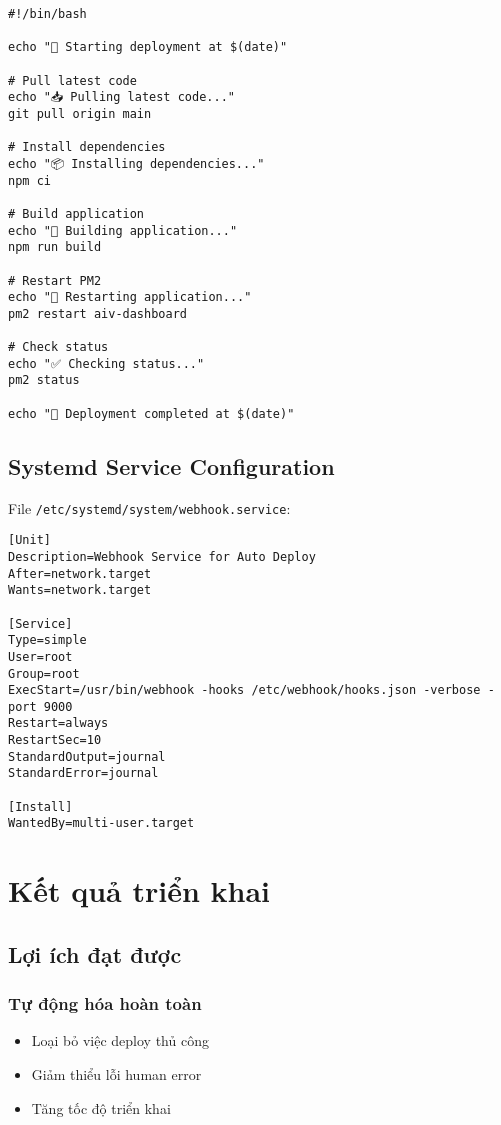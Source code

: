 \documentclass[12pt,a4paper]{article}
\begin{document}
\begin{lstlisting}[caption=Script deployment tự động]
#!/bin/bash

echo "🚀 Starting deployment at $(date)"

# Pull latest code
echo "📥 Pulling latest code..."
git pull origin main

# Install dependencies
echo "📦 Installing dependencies..."
npm ci

# Build application
echo "🔨 Building application..."
npm run build

# Restart PM2
echo "🔄 Restarting application..."
pm2 restart aiv-dashboard

# Check status
echo "✅ Checking status..."
pm2 status

echo "🎉 Deployment completed at $(date)"
\end{lstlisting}

\subsection{Systemd Service Configuration}

File \texttt{/etc/systemd/system/webhook.service}:

\begin{lstlisting}[caption=Cấu hình systemd service]
[Unit]
Description=Webhook Service for Auto Deploy
After=network.target
Wants=network.target

[Service]
Type=simple
User=root
Group=root
ExecStart=/usr/bin/webhook -hooks /etc/webhook/hooks.json -verbose -port 9000
Restart=always
RestartSec=10
StandardOutput=journal
StandardError=journal

[Install]
WantedBy=multi-user.target
\end{lstlisting}

\section{Kết quả triển khai}

\subsection{Lợi ích đạt được}

\subsubsection{Tự động hóa hoàn toàn}
\begin{itemize}
    \item Loại bỏ việc deploy thủ công
    \item Giảm thiểu lỗi human error
    \item Tăng tốc độ triển khai
\end{itemize}
\end{document}
